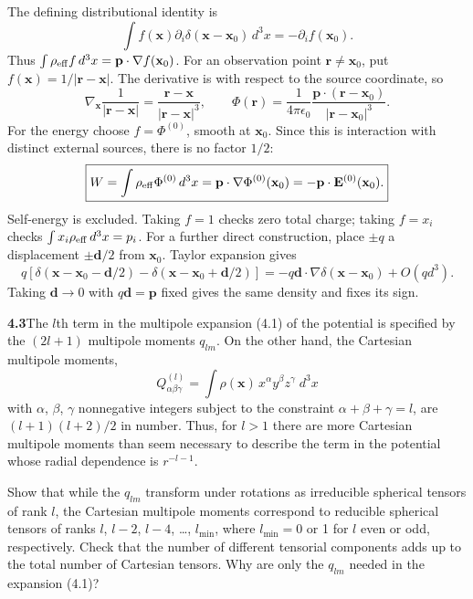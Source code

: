 The defining distributional identity is
\[
\int f(\mathbf x)\partial_i\delta(\mathbf x-\mathbf x_0)\,d^3x
=-\partial_i f(\mathbf x_0).
\]
Thus $\int\rho_{\rm eff}f\,d^3x=\mathbf p\cdot\nabla f(\mathbf x_0)$.
For an observation point $\mathbf r\ne\mathbf x_0$, put
$f(\mathbf x)=1/|\mathbf r-\mathbf x|$. The derivative is with respect
to the source coordinate, so
\[
\nabla_{\mathbf x}\frac1{|\mathbf r-\mathbf x|}
=\frac{\mathbf r-\mathbf x}{|\mathbf r-\mathbf x|^3},\qquad
\boxed{\Phi(\mathbf r)=\frac{1}{4\pi\epsilon_0}
\frac{\mathbf p\cdot(\mathbf r-\mathbf x_0)}{|\mathbf r-\mathbf x_0|^3}.}
\]
For the energy choose $f=\Phi^{(0)}$, smooth at $\mathbf x_0$. Since
this is interaction with distinct external sources, there is no factor $1/2$:
\[
\boxed{W=\int\rho_{\rm eff}\Phi^{(0)}\,d^3x
=\mathbf p\cdot\nabla\Phi^{(0)}(\mathbf x_0)
=-\mathbf p\cdot\mathbf E^{(0)}(\mathbf x_0).}
\]
Self-energy is excluded. Taking $f=1$ checks zero total charge;
taking $f=x_i$ checks $\int x_i\rho_{\rm eff}\,d^3x=p_i$.
For a further direct construction, place $\pm q$ a displacement
$\pm\mathbf d/2$ from $\mathbf x_0$. Taylor expansion gives
\[
q[\delta(\mathbf x-\mathbf x_0-\mathbf d/2)
-\delta(\mathbf x-\mathbf x_0+\mathbf d/2)]
=-q\mathbf d\cdot\nabla\delta(\mathbf x-\mathbf x_0)+O(qd^3).
\]
Taking $\mathbf d\to0$ with $q\mathbf d=\mathbf p$ fixed gives the
same density and fixes its sign.

\par\bigskip
\noindent\textbf{4.3}\quad The $l$th term in the multipole expansion (4.1) of the potential is specified by the $(2l+1)$ multipole moments $q_{lm}$. On the other hand, the Cartesian multipole moments,
\[
Q_{\alpha\beta\gamma}^{(l)}=\int\rho(\mathbf{x})\,x^{\alpha}y^{\beta}z^{\gamma}\;d^{3}x
\]
with $\alpha$, $\beta$, $\gamma$ nonnegative integers subject to the constraint $\alpha+\beta+\gamma=l$, are $(l+1)(l+2)/2$ in number. Thus, for $l>1$ there are more Cartesian multipole moments than seem necessary to describe the term in the potential whose radial dependence is $r^{-l-1}$.

Show that while the $q_{lm}$ transform under rotations as irreducible spherical tensors of rank $l$, the Cartesian multipole moments correspond to reducible spherical tensors of ranks $l$, $l-2$, $l-4$, \ldots, $l_{\min}$, where $l_{\min}=0$ or 1 for $l$ even or odd, respectively. Check that the number of different tensorial components adds up to the total number of Cartesian tensors. Why are only the $q_{lm}$ needed in the expansion (4.1)?
\solution

